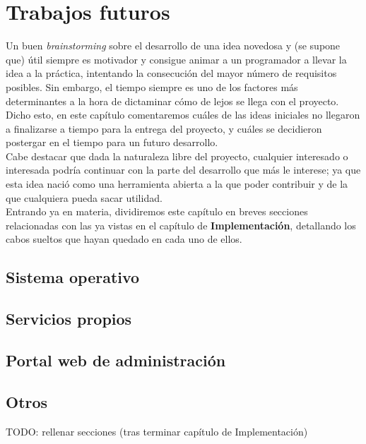 \chapter{Trabajos futuros}

Un buen \textit{brainstorming} sobre el desarrollo de una idea novedosa y (se supone que) útil siempre es motivador y consigue animar a un programador a llevar la idea a la práctica, intentando la consecución del mayor número de requisitos posibles. Sin embargo, el tiempo siempre es uno de los factores más determinantes a la hora de dictaminar cómo de lejos se llega con el proyecto.\\

Dicho esto, en este capítulo comentaremos cuáles de las ideas iniciales no llegaron a finalizarse a tiempo para la entrega del proyecto, y cuáles se decidieron postergar en el tiempo para un futuro desarrollo.\\

Cabe destacar que dada la naturaleza libre del proyecto, cualquier interesado o interesada podría continuar con la parte del desarrollo que más le interese; ya que esta idea nació como una herramienta abierta a la que poder contribuir y de la que cualquiera pueda sacar utilidad.\\

Entrando ya en materia, dividiremos este capítulo en breves secciones relacionadas con las ya vistas en el capítulo de \textbf{Implementación}, detallando los cabos sueltos que hayan quedado en cada uno de ellos.

\section{Sistema operativo}

\section{Servicios propios}

\section{Portal web de administración}

\section{Otros}

TODO: rellenar secciones (tras terminar capítulo de Implementación)